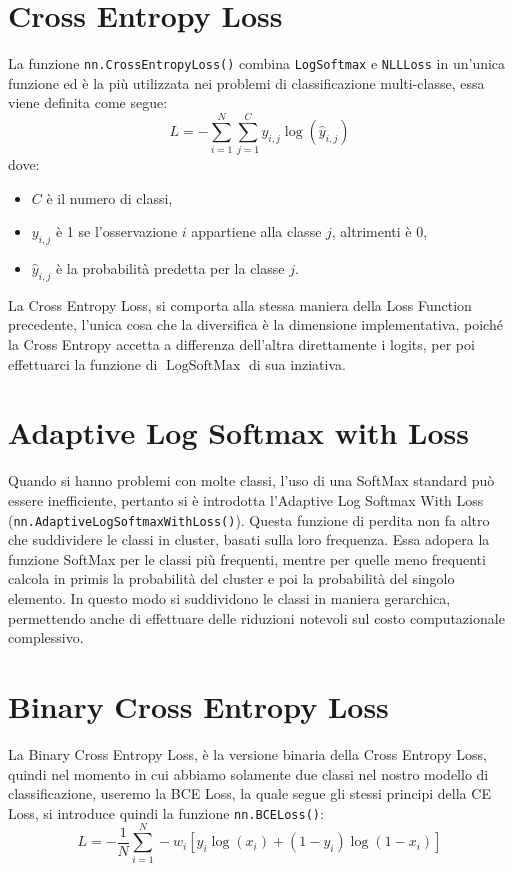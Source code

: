 \section{Cross Entropy Loss}
La funzione \texttt{nn.CrossEntropyLoss()} combina \texttt{LogSoftmax} e \texttt{NLLLoss} in un'unica funzione ed è la più utilizzata nei problemi di classificazione multi-classe, essa viene definita come segue:
\begin{equation}
L = - \sum_{i=1}^{N} \sum_{j=1}^{C} y_{i,j} \log(\hat{y}_{i,j})
\end{equation}
dove:
\begin{itemize}
    \item $C$ è il numero di classi,
    \item $y_{i,j}$ è 1 se l'osservazione $i$ appartiene alla classe $j$, altrimenti è 0,
    \item $\hat{y}_{i,j}$ è la probabilità predetta per la classe $j$.
\end{itemize}
La Cross Entropy Loss, si comporta alla stessa maniera della Loss Function precedente, l'unica cosa che la diversifica è la dimensione implementativa, poiché la Cross Entropy accetta a differenza dell'altra direttamente i logits, per poi effettuarci la funzione di $\operatorname{LogSoftMax}$ di sua inziativa.

\section{Adaptive Log Softmax with Loss}
Quando si hanno problemi con molte classi, l'uso di una SoftMax standard può essere inefficiente, pertanto si è introdotta l'Adaptive Log Softmax With Loss (\texttt{nn.AdaptiveLogSoftmaxWithLoss()}). Questa funzione di perdita non fa altro che suddividere le classi in cluster, basati sulla loro frequenza. Essa adopera la funzione SoftMax per le classi più frequenti, mentre per quelle meno frequenti calcola in primis la probabilità del cluster e poi la probabilità del singolo elemento. In questo modo si suddividono le classi in maniera gerarchica, permettendo anche di effettuare delle riduzioni notevoli sul costo computazionale complessivo.

\section{Binary Cross Entropy Loss}
La Binary Cross Entropy Loss, è la versione binaria della Cross Entropy Loss, quindi nel momento in cui abbiamo solamente due classi nel nostro modello di classificazione, useremo la BCE Loss, la quale segue gli stessi principi della CE Loss, si introduce quindi la funzione \texttt{nn.BCELoss()}:
\begin{equation}
L = - \frac{1}{N} \sum_{i=1}^{N} -w_i\left[y_i \log({x}_i) + (1 - y_i) \log(1 - x_i) \right]
\end{equation}

